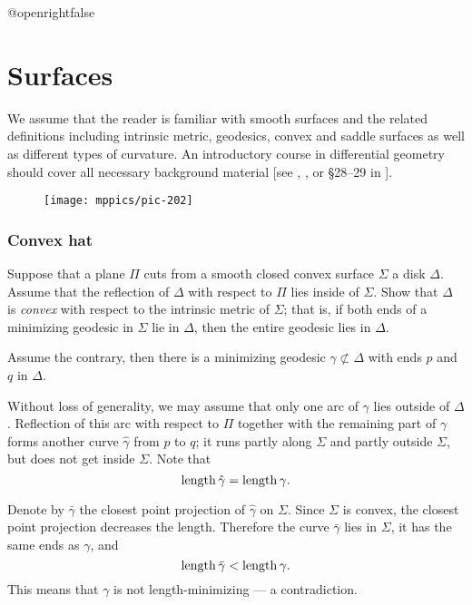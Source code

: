 \csname @openrightfalse\endcsname
\chapter{Surfaces}

We assume that the reader is familiar with smooth surfaces and the related definitions
including intrinsic metric, 
geodesics,
convex and saddle surfaces
as well as different types of curvature.
An introductory course in differential geometry should cover all necessary background material 
[see , , or \S28--29 in ].



{

\begin{wrapfigure}{r}{27 mm}
\vskip4mm
\centering
\texttt{[image: mppics/pic-202]}
\end{wrapfigure}


\subsection*{Convex hat}
\label{Convex hat}

\begin{pr}
Suppose that a plane $\Pi$ cuts from a smooth closed convex surface $\Sigma$ a disk $\Delta$.
Assume that the reflection of $\Delta$ with respect to $\Pi$ lies inside of $\Sigma$.
Show that $\Delta$ is \emph{convex} with respect to the intrinsic metric  of $\Sigma$;
that is, 
if both ends of a minimizing geodesic in $\Sigma$ 
lie in $\Delta$,
then the entire geodesic lies in $\Delta$.
\end{pr}

}


Assume the contrary,
then there is a minimizing geodesic $\gamma\not\subset\Delta$ with ends $p$ and $q$ in $\Delta$.

Without loss of generality, we may assume that only one arc of $\gamma$ lies outside of $\Delta$.
Reflection of this arc  with respect to $\Pi$ together with the remaining part of $\gamma$ forms another curve $\hat\gamma$ from $p$ to $q$;
it runs partly along $\Sigma$ 
and partly outside $\Sigma$,
but does not get inside $\Sigma$.
Note that
\[\operatorname{\rm length}\hat\gamma=\operatorname{\rm length}\gamma.\]


Denote by $\bar\gamma$ the closest point projection of $\hat\gamma$ on $\Sigma$.
Since $\Sigma$ is convex, the closest point projection decreases the length.
Therefore 
the curve $\bar\gamma$ lies in $\Sigma$, 
it has the same ends as $\gamma$,
and
\[\operatorname{\rm length}\bar\gamma<\operatorname{\rm length}\gamma.\]
This means that $\gamma$ is not length-minimizing 
--- a contradiction.\qeds

